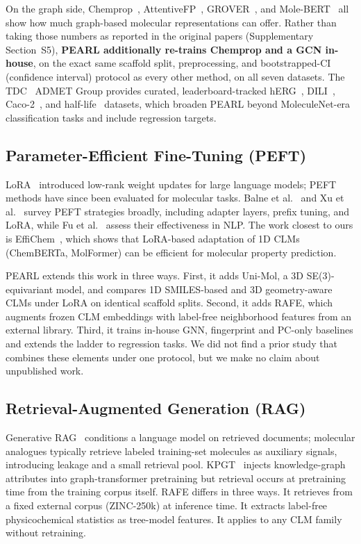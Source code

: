 \documentclass[pdflatex,sn-mathphys-num]{sn-jnl}%
\begin{document}
On the graph side, Chemprop~\cite{yang2019chemprop}, AttentiveFP~\cite{xiong2020attentivefp}, GROVER~\cite{rong2020grover}, and Mole-BERT~\cite{xia2023molecbert} all show how much graph-based molecular representations can offer. Rather than taking those numbers as reported in the original papers (Supplementary Section~S5), \textbf{PEARL additionally re-trains Chemprop and a GCN in-house}, on the exact same scaffold split, preprocessing, and bootstrapped-CI (confidence interval) protocol as every other method, on all seven datasets. The TDC~\cite{huang2021tdc} ADMET Group provides curated, leaderboard-tracked hERG~\cite{wang2016herg}, DILI~\cite{xu2019dili}, Caco-2~\cite{wang2016caco2}, and half-life~\cite{obach2008half} datasets, which broaden PEARL beyond MoleculeNet-era classification tasks and include regression targets.

\subsection{Parameter-Efficient Fine-Tuning (PEFT)}\label{sec:related_peft}
LoRA~\cite{hu2021lora} introduced low-rank weight updates for large language models; PEFT methods have since been evaluated for molecular tasks. Balne et al.~\cite{balne2024peft} and Xu et al.~\cite{xu2023peftreview} survey PEFT strategies broadly, including adapter layers, prefix tuning, and LoRA, while Fu et al.~\cite{fu2023effectiveness} assess their effectiveness in NLP. The work closest to ours is EffiChem~\cite{harod2025effichem}, which shows that LoRA-based adaptation of 1D CLMs (ChemBERTa, MolFormer) can be efficient for molecular property prediction.

PEARL extends this work in three ways. First, it adds Uni-Mol, a 3D SE(3)-equivariant model, and compares 1D SMILES-based and 3D geometry-aware CLMs under LoRA on identical scaffold splits. Second, it adds RAFE, which augments frozen CLM embeddings with label-free neighborhood features from an external library. Third, it trains in-house GNN, fingerprint and PC-only baselines and extends the ladder to regression tasks. We did not find a prior study that combines these elements under one protocol, but we make no claim about unpublished work.

\subsection{Retrieval-Augmented Generation (RAG)}\label{sec:related_rag}
Generative RAG~\cite{lewis2020rag} conditions a language model on retrieved documents; molecular analogues typically retrieve labeled training-set molecules as auxiliary signals, introducing leakage and a small retrieval pool. KPGT~\cite{liu2022kpgt} injects knowledge-graph attributes into graph-transformer pretraining but retrieval occurs at pretraining time from the training corpus itself. RAFE differs in three ways. It retrieves from a fixed external corpus (ZINC-250k) at inference time. It extracts label-free physicochemical statistics as tree-model features. It applies to any CLM family without retraining.
\end{document}
